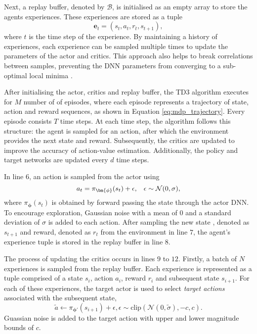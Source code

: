 Next, a replay buffer, denoted by $\mathcal{B}$, is initialised as an empty array to store the agents experiences.
These experiences are stored as a tuple 
\begin{equation}
    \bm{e}_t = (s_t,a_t,r_t,s_{t+1}),
\end{equation}
where $t$ is the time step of the experience.
By maintaining a history of experiences, each experience can be sampled multiple times to update the parameters of the actor and critics.
This approach also helps to break correlations between samples, preventing the DNN parameters from converging to a sub-optimal local minima \cite{mnih2013}.


After initialising the actor, critics and replay buffer, the TD3 algorithm executes for $M$ number of of episodes, where each episode represents a trajectory of state, action and reward sequences, as shown in Equation \ref{eq:mdp_trajectory}.
Every episode consists $T$ time steps.
At each time step, the algorithm follows this structure: the agent is sampled for an action, after which the environment provides the next state and reward.
Subsequently, the critics are updated to improve the accuracy of action-value estimation.
Additionally, the policy and target networks are updated every $d$ time steps.



In line $6$, an action is sampled from the actor using
\begin{equation}\label{eq:dpg_policy}
    a_t = \pi_{\bm{\phi}}(s_t) + \epsilon, \hspace{0.3cm} \epsilon \sim \mathcal{N}(0,\sigma),
\end{equation}
where $ \pi_{\bm{\phi}}(s_t)$ is obtained by forward passing the state through the actor DNN.
To encourage exploration, Gaussian noise with a mean of $0$ and a standard deviation of $\sigma$ is added to each action.
After sampling the new state , denoted as $s_{t+1}$ and reward, denoted as $r_{t}$ from the environment in line $7$, the agent's experience tuple is stored in the replay buffer in line $8$.



The process of updating the critics occurs in lines $9$ to $12$. 
Firstly, a batch of $N$ experiences is sampled from the replay buffer.
Each experience is represented as a tuple comprised of a state $s_i$, action $a_i$, reward $r_i$ and subsequent state $s_{i+1}$.
For each of these experiences, the target actor is used to select \emph{target actions} associated with the subsequent state,
\begin{equation}
    \tilde{a} \leftarrow \pi_{\bm{\phi}'}(s_{i+1}) + \epsilon, \epsilon \sim \text{clip}(\mathcal{N}(0,\tilde{\sigma}), -c,c).
\end{equation}
Guassian noise is added to the target action with upper and lower magnitude bounds of $c$.



